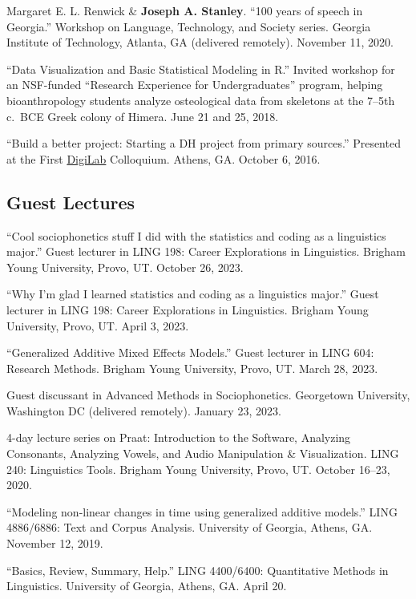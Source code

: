 \documentclass[
]{article}
\begin{document}
Margaret E. L. Renwick \& \textbf{Joseph A. Stanley}. ``100 years of
speech in Georgia.'' Workshop on Language, Technology, and Society
series. Georgia Institute of Technology, Atlanta, GA (delivered
remotely). November 11, 2020.

``Data Visualization and Basic Statistical Modeling in R.'' Invited
workshop for an NSF-funded ``Research Experience for Undergraduates''
program, helping bioanthropology students analyze osteological data from
skeletons at the 7--5th c.~BCE Greek colony of Himera. June 21 and 25,
2018.

``Build a better project: Starting a DH project from primary sources.''
Presented at the First \href{http://digi.uga.edu/digilab/}{DigiLab}
Colloquium. Athens, GA. October 6, 2016.

\hypertarget{guest-lectures}{%
\subsection{Guest Lectures}\label{guest-lectures}}

``Cool sociophonetics stuff I did with the statistics and coding as a
linguistics major.'' Guest lecturer in LING 198: Career Explorations in
Linguistics. Brigham Young University, Provo, UT. October 26, 2023.

``Why I'm glad I learned statistics and coding as a linguistics major.''
Guest lecturer in LING 198: Career Explorations in Linguistics. Brigham
Young University, Provo, UT. April 3, 2023.

``Generalized Additive Mixed Effects Models.'' Guest lecturer in LING
604: Research Methods. Brigham Young University, Provo, UT. March 28,
2023.

Guest discussant in Advanced Methods in Sociophonetics. Georgetown
University, Washington DC (delivered remotely). January 23, 2023.

4-day lecture series on Praat: Introduction to the Software, Analyzing
Consonants, Analyzing Vowels, and Audio Manipulation \& Visualization.
LING 240: Linguistics Tools. Brigham Young University, Provo, UT.
October 16--23, 2020.

``Modeling non-linear changes in time using generalized additive
models.'' LING 4886/6886: Text and Corpus Analysis. University of
Georgia, Athens, GA. November 12, 2019.

``Basics, Review, Summary, Help.'' LING 4400/6400: Quantitative Methods
in Linguistics. University of Georgia, Athens, GA. April 20.
\end{document}
